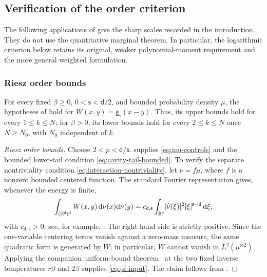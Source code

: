 \documentclass[11pt,reqno]{amsart}
\numberwithin{equation}{section}
\theoremstyle{plain}
\theoremstyle{remark}
\DeclarePairedDelimiter{\abs}{\lvert}{\rvert}
\renewcommand{\d}{\mathsf{d}}
\newcommand{\md}{\mathrm{d}}
\newcommand{\R}{{\mathbb{R}}}
\newcommand{\g}{{\mathsf{g}}}
\newcommand{\tl}{\widetilde}
\newcommand{\be}{\beta}
\newcommand{\s}{\mathsf{s}}
\begin{document}
\subsection{Verification of the order criterion}
\label{subsec:model-order-verification}

The following applications of  give the sharp scales recorded in the introduction.  They do not use the quantitative marginal theorem.  In particular, the logarithmic criterion below retains its original, weaker polynomial-moment requirement and the more general weighted formulation.

\subsubsection{Riesz order bounds}
For every fixed $\be\geq0$, $0<\s<\d/2$, and bounded probability density $\mu$, the hypotheses of  hold for $W(x,y)=\g_\s(x-y)$.  Thus, its upper bounds hold for every $1\leq k\leq N$; for $\be>0$, its lower bounds hold for every $2\leq k\leq N$ once $N\geq N_0$, with $N_0$ independent of $k$.

\begin{proof}[Riesz order bounds]
Choose $2<p<\d/\s$.   supplies \eqref{eq:mu-controls} and the bounded lower-tail condition \eqref{eq:cavity-tail-bounded}.  To verify the separate nontriviality condition \eqref{eq:interaction-nontriviality}, let \(\nu=f\mu\), where \(f\) is a nonzero bounded centered function.  The standard Fourier representation gives, whenever the energy is finite,
\begin{align}\label{eq:riesz-zero-mass-fourier}
 \int_{(\R^\d)^2}W(x,y)\,\md\nu(x)\md\nu(y)
 =c_{\d,\s}\int_{\R^\d}\abs{\widehat\nu(\xi)}^2\abs{\xi}^{\s-\d}\,\md\xi,
\end{align}
with \(c_{\d,\s}>0\); see, for example, \cite[Chapter~4, Section~4.1]{SerfatyLN}.  The right-hand side is strictly positive.  Since the one-variable centering terms vanish against a zero-mass measure, the same quadratic form is generated by \(\tl W\); in particular, \(\tl W\) cannot vanish in \(L^2(\mu^{\otimes2})\).  Applying the companion uniform-bound theorem~\cite[Theorem~2.2\textup{(i)}]{DGR26} at the two fixed inverse temperatures \(r\be\) and \(2\be\) supplies \eqref{eq:pf-input}.  The claim follows from .
\end{proof}
\end{document}
